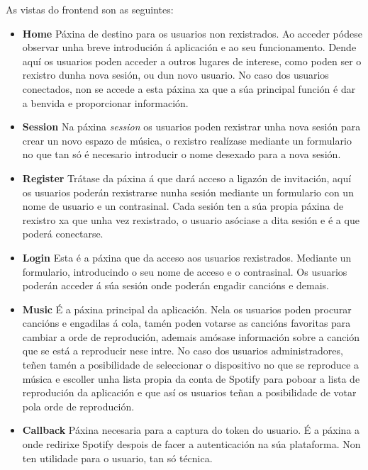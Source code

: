 As vistas do frontend son as seguintes:
\begin{itemize}
		\label{sec:paxinas_front}
	\item \textbf{Home}\smallbreak
		Páxina de destino para os usuarios non rexistrados. Ao acceder pódese observar unha breve introdución á aplicación e ao seu funcionamento. Dende aquí os usuarios poden acceder a outros lugares de interese, como poden ser o rexistro dunha nova sesión, ou dun novo usuario. No caso dos usuarios conectados, non se accede a esta páxina xa que a súa principal función é dar a benvida e proporcionar información.

	\item \textbf{Session}\smallbreak
		Na páxina \textit{session} os usuarios poden rexistrar unha nova sesión para crear un novo espazo de música, o rexistro realízase mediante un formulario no que tan só é necesario introducir o nome desexado para a nova sesión.

	\item \textbf{Register}\smallbreak
		Trátase da páxina á que dará acceso a ligazón de invitación, aquí os usuarios poderán rexistrarse nunha sesión mediante un formulario con un nome de usuario e un contrasinal. Cada sesión ten a súa propia páxina de rexistro xa que unha vez rexistrado, o usuario asóciase a dita sesión e é a que poderá conectarse.

	\item \textbf{Login}\smallbreak
		Esta é a páxina que da acceso aos usuarios rexistrados. Mediante un formulario, introducindo o seu nome de acceso e o contrasinal. Os usuarios poderán acceder á súa sesión onde poderán engadir cancións e demais.

	\item \textbf{Music}\smallbreak
		É a páxina principal da aplicación. Nela os usuarios poden procurar cancións e engadilas á cola, tamén poden votarse as cancións favoritas para cambiar a orde de reprodución, ademais amósase información sobre a canción que se está a reproducir nese intre. No caso dos usuarios administradores, teñen tamén a posibilidade de seleccionar o dispositivo no que se reproduce a música e escoller unha lista propia da conta de Spotify para poboar a lista de reprodución da aplicación e que así os usuarios teñan a posibilidade de votar pola orde de reprodución.

	\item \textbf{Callback}\smallbreak
		Páxina necesaria para a captura do token do usuario. É a páxina a onde redirixe Spotify despois de facer a autenticación na súa plataforma. Non ten utilidade para o usuario, tan só técnica.
\end{itemize}

